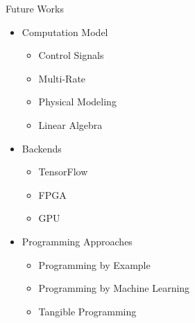 
\begin{frame}[fragile]{Future Works}
    \begin{itemize}
        \item Computation Model
        \begin{itemize}
            \item Control Signals
            \item Multi-Rate
            \item Physical Modeling
            \item Linear Algebra
        \end{itemize}
        \item Backends
        \begin{itemize}
            \item TensorFlow
            \item FPGA
            \item GPU
        \end{itemize}
        \item Programming Approaches
        \begin{itemize}
            \item Programming by Example
            \item Programming by Machine Learning
            \item Tangible Programming
        \end{itemize}
    \end{itemize}
\end{frame}
